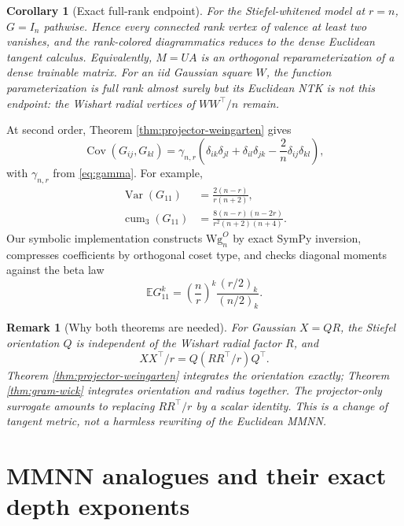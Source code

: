 \documentclass{article}
\newtheorem{corollary}[theorem]{Corollary}
\newtheorem{remark}[theorem]{Remark}
\newcommand{\E}{\mathbb E}
\newcommand{\Cov}{\operatorname{Cov}}
\newcommand{\Var}{\operatorname{Var}}
\newcommand{\cum}{\operatorname{cum}}
\begin{document}
\begin{corollary}[Exact full-rank endpoint]
\label{cor:full-rank-endpoint}
For the Stiefel-whitened model at \(r=n\), \(G=I_n\) pathwise.  Hence every
connected rank vertex of valence at least two vanishes, and the rank-colored
diagrammatics reduces to the dense Euclidean tangent calculus.  Equivalently,
\(M=UA\) is an orthogonal reparameterization of a dense trainable matrix.
For an iid Gaussian square \(W\), the function parameterization is full rank
almost surely but its Euclidean NTK is not this endpoint: the Wishart radial
vertices of \(WW^\top/n\) remain.
\end{corollary}

At second order, Theorem \ref{thm:projector-weingarten} gives
\begin{equation}
\Cov(G_{ij},G_{kl})
=\gamma_{n,r}
\left(\delta_{ik}\delta_{jl}+\delta_{il}\delta_{jk}
-\frac2n\delta_{ij}\delta_{kl}\right),
\label{eq:projector-covariance}
\end{equation}
with \(\gamma_{n,r}\) from \eqref{eq:gamma}.  For example,
\begin{align}
\Var(G_{11})&=\frac{2(n-r)}{r(n+2)},\\
\cum_3(G_{11})&=\frac{8(n-r)(n-2r)}{r^2(n+2)(n+4)}.
\end{align}
Our symbolic implementation constructs \(\mathrm{Wg}^{O}_n\) by exact
SymPy inversion, compresses coefficients by orthogonal coset type, and checks
diagonal moments against the beta law
\begin{equation}
\E G_{11}^k=\left(\frac nr\right)^k
\frac{(r/2)_k}{(n/2)_k}.
\end{equation}

\begin{remark}[Why both theorems are needed]
For Gaussian \(X=QR\), the Stiefel orientation \(Q\) is independent of the
Wishart radial factor \(R\), and
\[
XX^\top/r=Q(RR^\top/r)Q^\top.
\]
Theorem \ref{thm:projector-weingarten} integrates the orientation exactly;
Theorem \ref{thm:gram-wick} integrates orientation and radius together.  The
projector-only surrogate amounts to replacing \(RR^\top/r\) by a scalar
identity.  This is a change of tangent metric, not a harmless rewriting of the
Euclidean MMNN.
\end{remark}

\section{MMNN analogues and their exact depth exponents}
\label{sec:mmnn-exponents}
\end{document}
